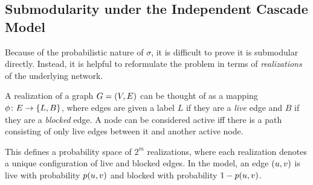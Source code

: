 
\subsection{Submodularity under the Independent Cascade Model}
Because of the probabilistic nature of $\sigma$, it is difficult to prove it is submodular directly. Instead, it is helpful to reformulate the problem in terms of \emph{realizations} of the underlying network.

\begin{definition}[Realization]
    A realization of a graph $G = \left( V, E \right)$ can be thought of as a mapping $\phi\colon E 
    \to \left\{ L, B \right\}$, where edges are given a label $L$ if they are a \emph{live} edge and $B$ if they are a \emph{blocked} edge. A node can be considered active iff there is a path consisting of only live edges between it and another active node. 
    \label{def:realization}
\end{definition}

This defines a probability space of $2^m$ realizations, where each realization denotes a unique configuration of live and blocked edges. 
In the \icmodel{} model, an edge $\left( u, v \right)$ is live with probability $p \! \left( u,v \right)$ and blocked with probability $1 - p \! \left( u,v \right)$. 

